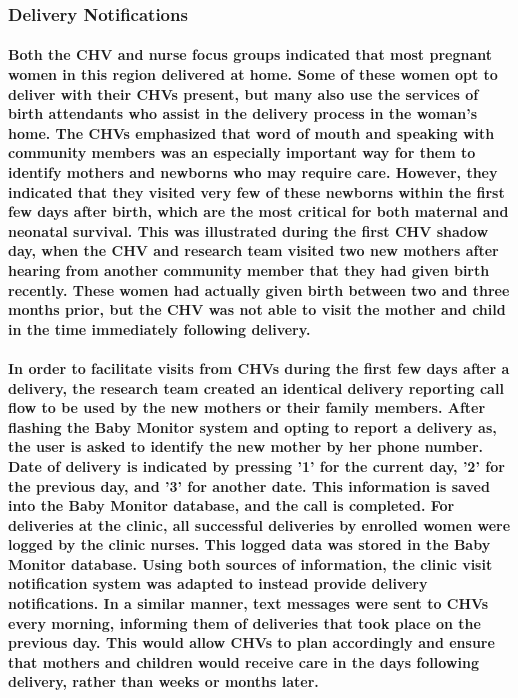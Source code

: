 \subsubsection{Delivery Notifications}
\paragraph{Both the CHV and nurse focus groups indicated that most pregnant women in this region delivered at home. Some of these women opt to deliver with their CHVs present, but many also use the services of birth attendants who assist in the delivery process in the woman's home.  The CHVs emphasized that word of mouth and speaking with community members was an especially important way for them to identify mothers and newborns who may require care. However, they indicated that they visited very few of these newborns within the first few days after birth, which are the most critical for both maternal and neonatal survival. This was illustrated during the first CHV shadow day, when the CHV and research team visited two new mothers after hearing from another community member that they had given birth recently. These women had actually given birth between two and three months prior, but the CHV was not able to visit the mother and child in the time immediately following delivery.}

\paragraph{In order to facilitate visits from CHVs during the first few days after a delivery, the research team created an identical delivery reporting call flow to be used by the new mothers or their family members. After flashing the Baby Monitor system and opting to report a delivery as, the user is asked to identify the new mother by her phone number. Date of delivery is indicated by pressing '1' for the current day, '2' for the previous day, and '3' for another date. This  information is saved into the Baby Monitor database, and the call is completed. For deliveries at the clinic, all successful deliveries by enrolled women were logged by the clinic nurses. This logged data was stored in the Baby Monitor database. Using both sources of information, the clinic visit notification system was adapted to instead provide delivery notifications. In a similar manner, text messages were sent to CHVs every morning, informing them of deliveries that took place on the previous day. This would allow CHVs to plan accordingly and ensure that mothers and children would receive care in the days following delivery, rather than weeks or months later.}


